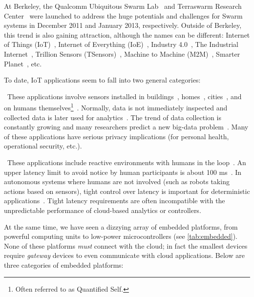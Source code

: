At Berkeley, the Qualcomm Ubiquitous Swarm Lab~\cite{swarmlab} and Terraswarm
Research Center~\cite{terraswarm} were launched to address the huge potentials
and challenges for Swarm systems in December 2011 and January 2013,
respectively. Outside of Berkeley, this trend is also gaining attraction,
although the names can be different: Internet of Things
(IoT)~\cite{atzori2010internet}, Internet of Everything
(IoE)~\cite{bradley2013internet}, Industry 4.0~\cite{lasi2014industry}, The
Industrial Internet~\cite{eigner2018industrial}, Trillion Sensors
(TSensors)~\cite{bogue2014towards}, Machine to Machine
(M2M)~\cite{anton2014machine}, Smarter Planet~\cite{palmisano2008smarter}, etc.

To date, IoT applications seem to fall into two general categories:

~These applications involve sensors
installed in buildings~\cite{dawson2010smap}, homes~\cite{hnat2011hitchhiker},
cities~\cite{sfpark}, and on humans themselves\footnote{Often referred to as
  Quantified Self.}~\cite{fitbit, swan2013quantified}.  Normally, data is not
immediately inspected and collected data is later used for
analytics~\cite{kolter2011redd}.  The trend of data collection is constantly
growing and many researchers predict a new big-data problem~\cite{diaz2012big,
  zaslavsky2013sensing}.  Many of these applications have serious privacy
implications (for personal health, operational security, etc.).

~These applications
include reactive environments with humans in the
loop~\cite{cooperstock1997reactive}.
An upper latency limit to avoid notice by human participants is about 100
ms~\cite{nielsen1994usability}.  In autonomous systems where humans are not
involved (such as robots taking actions based on sensors), tight control over
latency is important for deterministic
applications~\cite{eidson2012distributed}.  Tight latency requirements are often
incompatible with the unpredictable performance of cloud-based analytics or
controllers.

At the same time, we have seen a dizzying array of embedded platforms, from
powerful computing units to low-power microcontrollers (see
\autoref{tab:embedded}). None of these platforms \emph{must} connect with the
cloud; in fact the smallest devices require \emph{gateway} devices to even
communicate with cloud applications. Below are three categories of embedded
platforms:

